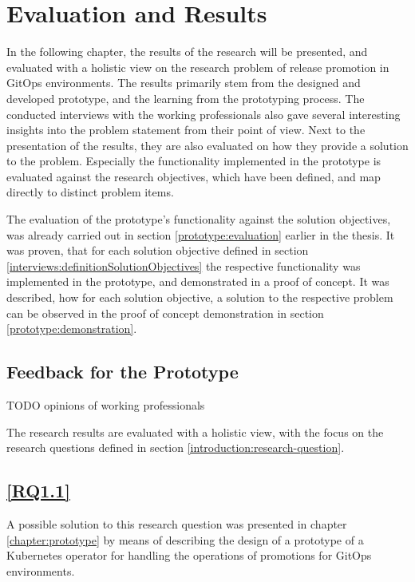 \chapter{Evaluation and Results}
\label{evaluation-and-results}

In the following chapter,
the results of the research will be presented,
and evaluated with a holistic view on the research problem of release promotion in GitOps environments.
The results primarily stem from the designed and developed prototype,
and the learning from the prototyping process.
The conducted interviews with the working professionals also gave several interesting insights into
the problem statement from their point of view.
Next to the presentation of the results, they are also evaluated on how they provide a solution
to the problem.
Especially the functionality implemented in the prototype is evaluated against the research objectives,
which have been defined, and map directly to distinct problem items.

The evaluation of the prototype's functionality against the solution objectives,
was already carried out in section \ref{prototype:evaluation} earlier in the thesis.
It was proven, that for each solution objective defined in section \ref{interviews:definitionSolutionObjectives}
the respective functionality was implemented in the prototype,
and demonstrated in a proof of concept.
It was described, how for each solution objective,
a solution to the respective problem can be observed in the
proof of concept demonstration in section \ref{prototype:demonstration}.

\section*{Feedback for the Prototype}

{\color{red}TODO opinions of working professionals}


The research results are evaluated with a holistic view,
with the focus on the research questions defined in section \ref{introduction:research-question}.

\section*{\ref{RQ1.1}}

A possible solution to this research question was presented in chapter
\ref{chapter:prototype}
by means of describing the design of a prototype
of a Kubernetes operator for handling the operations of promotions for GitOps environments.

